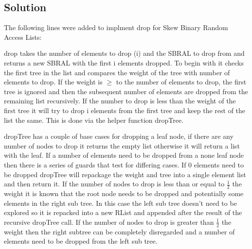 \documentclass[a4paper]{article}
\begin{document}
\subsection{Solution}
The following lines were added to implment drop for Skew Binary Random Access Lists:

\par
drop takes the number of elements to drop (i) and the SBRAL to drop from and returns a new SBRAL with the first i elements dropped.
To begin with it checks the first tree in the list and compares the weight of the tree with number of elements to drop.
If the weight is \( \geq \) to the number of elements to drop, the first tree is ignored and then the subsequent number of elements are dropped from the remaining list recursively.
If the number to drop is less than the weight of the first tree it will try to drop i elements from the first tree and keep the rest of the list the same.
This is done via the helper function dropTree.
\par
dropTree has a couple of base cases for dropping a leaf node, if there are any number of nodes to drop it returns the empty list otherwise it will return a list with the leaf.
If a number of elements need to be dropped from a none leaf node then there is a series of guards that test for differing cases.
If 0 elements need to be dropped dropTree will repackage the weight and tree into a single element list and then return it.
If the number of nodes to drop is less than or equal to \( \frac{1}{2} \) the weight it is known that the root node needs to be dropped and potentially some elements in the right sub tree.
In this case the left sub tree doesn't need to be explored so it is repacked into a new RList and appended after the result of the recursive dropTree call.
If the number of nodes to drop is greater than \( \frac{1}{2} \) the weight then the right subtree can be completely disregarded and a number of elements need to be dropped from the left sub tree.
\end{document}
